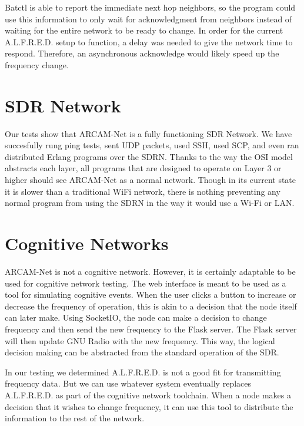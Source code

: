 Batctl is able to report the immediate next hop neighbors, so the program could use this information to only wait for acknowledgment from neighbors instead of waiting for the entire network to be ready to change. In order for the current A.L.F.R.E.D. setup to function, a delay was needed to give the network time to respond. Therefore, an asynchronous acknowledge would likely speed up the frequency change. 



\section{SDR Network}

Our tests show that ARCAM-Net is a fully functioning SDR Network. We have succesfully rung ping tests, sent UDP packets, used SSH, used SCP, and even ran distributed Erlang programs over the SDRN. Thanks to the way the OSI model abstracts each layer, all programs that are designed to operate on Layer 3 or higher should see ARCAM-Net as a normal network. Though in its current state it is slower than a traditional WiFi network, there is nothing preventing any normal program from using the SDRN in the way it would use a Wi-Fi or LAN. 


\section{Cognitive Networks}

ARCAM-Net is not a cognitive network. However, it is certainly adaptable to be used for cognitive network testing. The web interface is meant to be used as a tool for simulating cognitive events. When the user clicks a button to increase or decrease the frequency of operation, this is akin to a decision that the node itself can later make. Using SocketIO, the node can make a decision to change frequency and then send the new frequency to the Flask server. The Flask server will then update GNU Radio with the new frequency. This way, the logical decision making can be abstracted from the standard operation of the SDR. 

In our testing we determined A.L.F.R.E.D. is not a good fit for transmitting frequency data. But we can use whatever system eventually replaces A.L.F.R.E.D. as part of the cognitive network toolchain. When a node makes a decision that it wishes to change frequency, it can use this tool to distribute the information to the rest of the network. 

